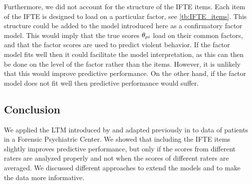 \documentclass[a4paper,11pt]{article}
\begin{document}
Furthermore, we did not account for the structure of the IFTE items.
Each item of the IFTE is designed to load on a particular factor, see \autoref{tb:IFTE_items}.
This structure could be added to the model introduced here as a confirmatory factor model.
This would imply that the true scores $\theta_{pi}$ load on their common factors, and that the factor scores are used to predict violent behavior.
If the factor model fits well then it could facilitate the model interpretation, as this can then be done on the level of the factor rather than the items.
However, it is unlikely that this would improve predictive performance.
On the other hand, if the factor model does not fit well then predictive performance would suffer.

\subsection{Conclusion}
We applied the LTM introduced by \textcite{Anders2015cultural} and adapted previously in \textcite{vandenBergh2020cultural} to data of patients in a Forensic Psychiatric Center.
We showed that including the IFTE items slightly improves predictive performance, but only if the scores from different raters are analyzed properly and not when the scores of different raters are averaged.
We discussed different approaches to extend the models and to make the data more informative.

\printbibliography
\newpage

\appendix
\end{document}
